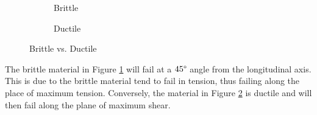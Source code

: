 \documentclass[12pt]{article}
\begin{document}
\begin{figure}[H]
  \centering
  \begin{subfigure}[H]{0.45\textwidth}
    \centering
    
    \caption{Brittle}
    \label{fig:048}
  \end{subfigure}
  \begin{subfigure}[H]{0.45\textwidth}
    \centering
    
    \caption{Ductile}
    \label{fig:049}
  \end{subfigure}
  \caption{Brittle vs. Ductile}
  \label{fig:brittleVsDuctile}
\end{figure}

The brittle material in Figure \ref{fig:048} will fail at a $45\degree$ angle from the longitudinal axis. This is due to the brittle material tend to fail in tension, thus failing along the place of maximum tension. Conversely, the material in Figure \ref{fig:049} is ductile and will then fail along the plane of maximum shear.
\end{document}
